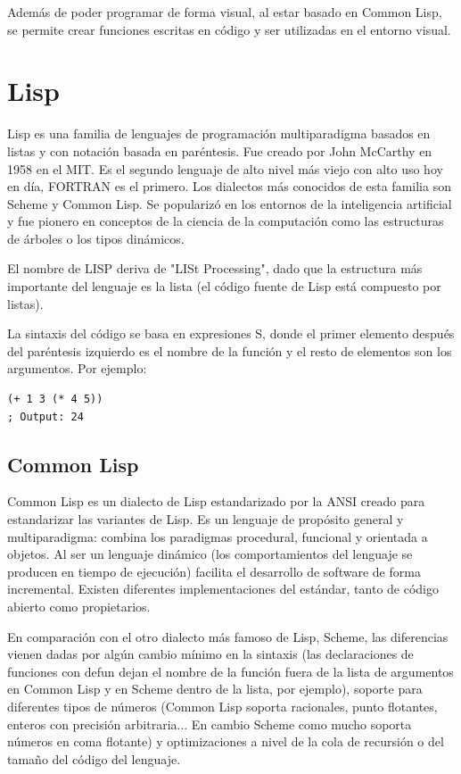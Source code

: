 \documentclass[a4paper,openany,12pt]{memoir}
\begin{document}
Además de poder programar de forma visual, al estar basado en Common Lisp, se permite crear funciones escritas en código y ser utilizadas en el entorno visual.
\section{Lisp}
Lisp es una familia de lenguajes de programación multiparadigma basados en listas y con notación basada en paréntesis. Fue creado por John McCarthy en 1958 en el MIT. Es el segundo lenguaje de alto nivel más viejo con alto uso hoy en día, FORTRAN es el primero. Los dialectos más conocidos de esta familia son Scheme y Common Lisp. Se popularizó en los entornos de la inteligencia artificial y fue pionero en conceptos de la ciencia de la computación como las estructuras de árboles o los tipos dinámicos.

El nombre de LISP deriva de "LISt Processing", dado que la estructura más importante del lenguaje es la lista (el código fuente de Lisp está compuesto por listas).\cite{wiki:lisp}

La sintaxis del código se basa en expresiones S, donde el primer elemento después del paréntesis izquierdo es el nombre de la función y el resto de elementos son los argumentos. Por ejemplo:

\lstset{language=Lisp}
\begin{lstlisting}
(+ 1 3 (* 4 5))
; Output: 24
\end{lstlisting}


\subsection{Common Lisp}
Common Lisp es un dialecto de Lisp estandarizado por la ANSI creado para estandarizar las variantes de Lisp. Es un lenguaje de propósito general y multiparadigma: combina los paradigmas procedural, funcional y orientada a objetos. Al ser un lenguaje dinámico (los comportamientos del lenguaje se producen en tiempo de ejecución) facilita el desarrollo de software de forma incremental. Existen diferentes implementaciones del estándar, tanto de código abierto como propietarios. \cite{wiki:commonlisp} 

En comparación con el otro dialecto más famoso de Lisp, Scheme, las diferencias vienen dadas por algún cambio mínimo en la sintaxis (las declaraciones de funciones con defun dejan el nombre de la función fuera de la lista de argumentos en Common Lisp y en Scheme dentro de la lista, por ejemplo), soporte para diferentes tipos de números (Common Lisp soporta racionales, punto flotantes, enteros con precisión arbitraria... En cambio Scheme como mucho soporta números en coma flotante) y optimizaciones a nivel de la cola de recursión o del tamaño del código del lenguaje.
\end{document}
